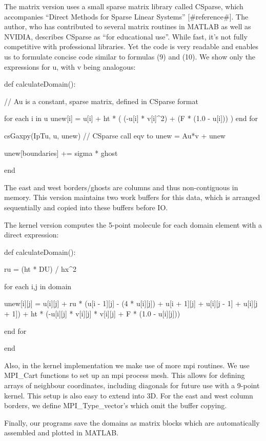 \documentclass[a4paper,11pt]{article}
\begin{document}
The matrix version uses a small sparse matrix library called CSparse, which accompanies ``Direct Methods for Sparse Linear Systems'' [#reference#]. The author, who has contributed to several matrix routines in MATLAB as well as NVIDIA, describes CSparse as ``for educational use''. While fast, it's not fully competitive with professional libraries. Yet the code is very readable and enables us to formulate concise code similar to formulas (9) and (10). We show only the expressions for u, with v being analogous:

def calculateDomain():

  // Au is a constant, sparse matrix, defined in CSparse format

  for each i in u
    unew[i] = u[i] + ht * ( (-u[i] * v[i]^2) + (F * (1.0 - u[i])) )
  end for

  csGaxpy(IpTu, u, unew)   // CSparse call eqv to unew = Au*v + unew

  unew[boundaries] += sigma * ghost

end

The east and west borders/ghosts are columns and thus non-contiguous in memory. This version maintains two work buffers for this data, which is arranged sequentially and copied into these buffers before IO.

The kernel version computes the 5-point molecule for each domain element with a direct expression:

def calculateDomain():

  ru = (ht * DU) / hx^2

  for each i,j in domain

    unew[i][j] = u[i][j] + ru * (u[i - 1][j] - (4 * u[i][j]) + u[i + 1][j] + u[i][j - 1] + u[i][j + 1]) + ht * (-u[i][j] * v[i][j] * v[i][j] + F * (1.0 - u[i][j]))

  end for

end

Also, in the kernel implementation we make use of more mpi routines. We use MPI_Cart functions to set up an mpi process mesh. This allows for defining arrays of neighbour coordinates, including diagonals for future use with a 9-point kernel. This setup is also easy to extend into 3D. For the east and west column borders, we define MPI_Type_vector's which omit the buffer copying.

Finally, our programs save the domains as matrix blocks which are automatically assembled and plotted in MATLAB.
\end{document}
